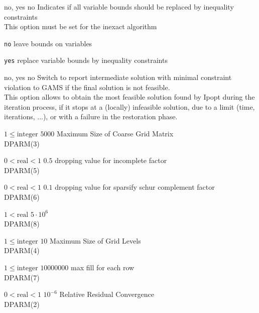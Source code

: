 %
{\ttfamily no, yes}%
{no}%
{Indicates if all variable bounds should be replaced by inequality constraints\\
This option must be set for the inexact algorithm}%
{\begin{list}{}{
\setlength{\parsep}{0em}
\setlength{\leftmargin}{5ex}
\setlength{\labelwidth}{2ex}
\setlength{\itemindent}{0ex}
\setlength{\topsep}{0pt}}
\item[\texttt{no}] leave bounds on variables
\item[\texttt{yes}] replace variable bounds by inequality constraints
\end{list}
}

%
{\ttfamily no, yes}%
{no}%
{Switch to report intermediate solution with minimal constraint violation to GAMS if the final solution is not feasible.\\
This option allows to obtain the most feasible solution found by Ipopt during the iteration process, if it stops at a (locally) infeasible solution, due to a limit (time, iterations, ...), or with a failure in the restoration phase.}%
{}

%
{$1\leq\textrm{integer}$}%
{$5000$}%
{Maximum Size of Coarse Grid Matrix\\
DPARM(3)}%
{}

%
{$0<\textrm{real}<1$}%
{$0.5$}%
{dropping value for incomplete factor\\
DPARM(5)}%
{}

%
{$0<\textrm{real}<1$}%
{$0.1$}%
{dropping value for sparsify schur complement factor\\
DPARM(6)}%
{}

%
{$1<\textrm{real}$}%
{$5 \cdot 10^{  6}$}%
{\\
DPARM(8)}%
{}

%
{$1\leq\textrm{integer}$}%
{$10$}%
{Maximum Size of Grid Levels\\
DPARM(4)}%
{}

%
{$1\leq\textrm{integer}$}%
{$10000000$}%
{max fill for each row\\
DPARM(7)}%
{}

%
{$0<\textrm{real}<1$}%
{$10^{- 6}$}%
{Relative Residual Convergence\\
DPARM(2)}%
{}

